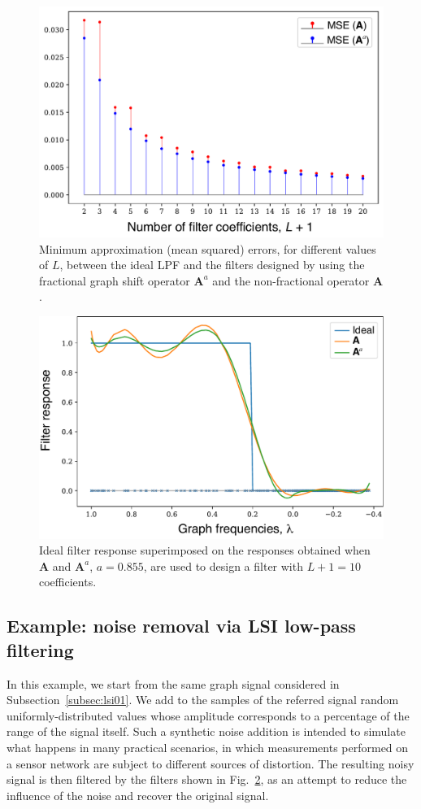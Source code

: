 \begin{figure}[t!]
    \centering
    \includegraphics[width=0.65\linewidth]{Figures/ERROR_mse_min.pdf}
    \caption{Minimum approximation (mean squared) errors, for different values of $L$, between the ideal LPF and the filters designed by using the fractional graph shift operator $\mathbf{A}^a$ and the non-fractional operator $\mathbf{A}$.}%
    \label{fig:usa03}%
\end{figure}

\begin{figure}[t!]
    \centering
    \includegraphics[width=0.65\linewidth]{Figures/ERROR_estacoes_resposta_grau10.pdf}%
    \caption{Ideal filter response superimposed on the responses obtained when $\mathbf{A}$ and $\mathbf{A}^a$, $a=0.855$, are used to design a filter with $L+1=10$ coefficients.}
    \label{fig:usa04}%
\end{figure}

\subsection{Example: noise removal via LSI low-pass filtering}\label{subsec:lsi02}
In this example, we start from the same graph signal considered in Subsection~\ref{subsec:lsi01}. We add to the samples of the referred signal random uniformly-distributed values whose amplitude corresponds to a percentage of the range of the signal itself. Such a synthetic noise addition is intended to simulate what happens in many practical scenarios, in which measurements performed on a sensor network are subject to different sources of distortion. The resulting noisy signal is then filtered by the filters shown in Fig.~\ref{fig:usa04}, as an attempt to reduce the influence of the noise and recover the original signal.

